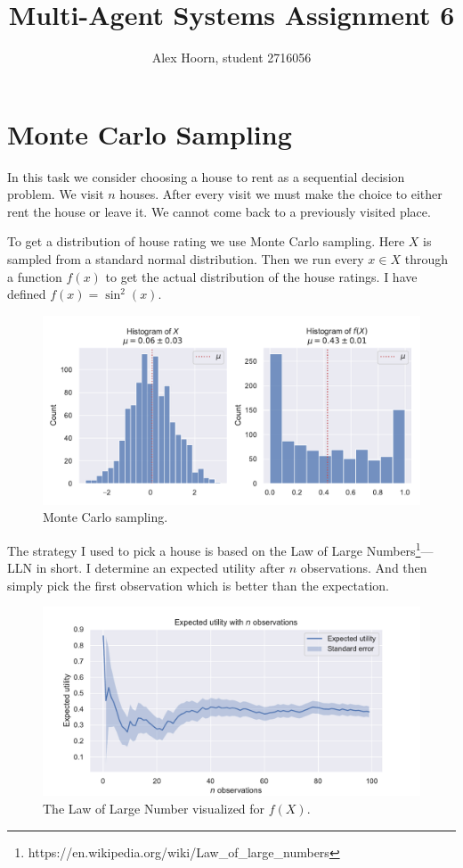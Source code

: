 \documentclass[]{scrartcl}
\title{Multi-Agent Systems Assignment 6}
\author{Alex Hoorn, student 2716056}
\begin{document}
\maketitle

\section{Monte Carlo Sampling}

In this task we consider choosing a house to rent as a sequential decision problem. We visit $n$ houses. After every visit we must make the choice to either rent the house or leave it. We cannot come back to a previously visited place.

To get a distribution of house rating we use Monte Carlo sampling. Here $X$ is sampled from a standard normal distribution. Then we run every $x \in X$ through a function $f(x)$ to get the actual distribution of the house ratings. I have defined $f(x)=\sin^2(x)$.

\begin{figure}[H]
	\centering
	\includegraphics[width=0.7\linewidth]{1-1.pdf}
	\caption{Monte Carlo sampling.}
	\label{fig:1-1}
\end{figure}

The strategy I used to pick a house is based on the Law of Large Numbers\footnote{https://en.wikipedia.org/wiki/Law\_of\_large\_numbers}---LLN in short.
I determine an expected utility after $n$ observations. And then simply pick the first observation which is better than the expectation.

\begin{figure}[H]
	\centering
	\includegraphics[width=0.7\linewidth]{1-2.pdf}
	\caption{The Law of Large Number visualized for $f(X)$.}
	\label{fig:1-2}
\end{figure}
\end{document}
